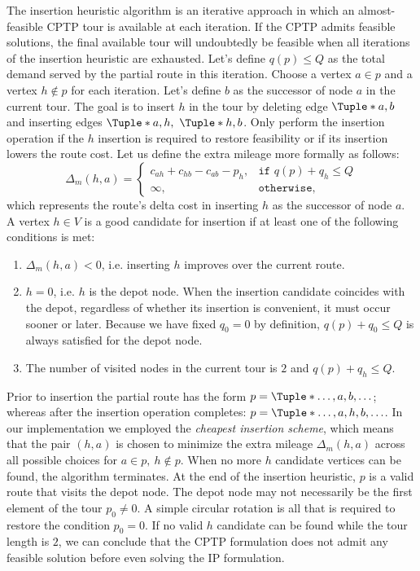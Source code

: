 The insertion heuristic algorithm is an iterative approach
in which an almost-feasible CPTP tour is available at each iteration.
If the CPTP admits feasible solutions,
the final available tour will undoubtedly be feasible
when all iterations of the insertion heuristic are exhausted.
Let's define $q(p) \le Q$ as the total demand served
by the partial route in this iteration.
Choose a vertex $a \in p$ and a vertex $h \notin p$ for each iteration.
Let's define $b$ as the successor of node $a$ in the current tour.
The goal is to insert $h$ in the tour
by deleting edge $\Tuple*{a, b}$
and inserting edges $\Tuple*{a, h},\ \Tuple*{h, b}$.
Only perform the insertion operation if the $h$ insertion
is required to restore feasibility or if its insertion lowers the route cost.
Let us define the extra mileage more formally as follows:
\begin{equation}
	\Delta_m(h, a) =
	\begin{cases}
		c_{ah} + c_{hb} - c_{ab} - p_h, & \texttt{if } q(p) + q_h \le Q \\
		\infty,                         & \texttt{otherwise},
	\end{cases}
\end{equation}
which represents the route's delta cost in inserting $h$ as the successor of node $a$.
A vertex $h \in V$ is a good candidate for insertion
if at least one of the following conditions is met:
\begin{enumerate}
	\setlength{\itemsep}{0pt}
	\setlength{\parskip}{0pt}

	\item $\Delta_m(h, a) < 0$, i.e. inserting $h$ improves over the current route.
	\item $h = 0$, i.e. $h$ is the depot node.
	      When the insertion candidate coincides with the depot,
	      regardless of whether its insertion is convenient, it must occur sooner or later.
	      Because we have fixed $q_0 = 0$ by definition,
	      $q(p) + q_0 \le Q$ is always satisfied for the depot node.
	\item The number of visited nodes in the current tour is $2$ and $q(p) + q_h \le Q$.
\end{enumerate}

Prior to insertion the partial route has the form $p = \Tuple*{\dots, a, b, \dots}$;
whereas after the insertion operation completes: $p = \Tuple*{\dots, a, h, b, \dots}$.
In our implementation we employed the \textit{cheapest insertion scheme},
which means that the pair $(h, a)$ is chosen to minimize the extra mileage $\Delta_m(h, a)$
across all possible choices for $a \in p,\ h \notin p$.
When no more $h$ candidate vertices can be found, the algorithm terminates.
At the end of the insertion heuristic, $p$ is a valid route that visits the depot node.
The depot node may not necessarily be the first element of the tour $p_0 \ne 0$.
A simple circular rotation is all that is required to restore the condition $p_0 = 0$.
If no valid $h$ candidate can be found while the tour length is $2$,
we can conclude that the CPTP formulation does not admit any feasible solution
before even solving the IP formulation.

